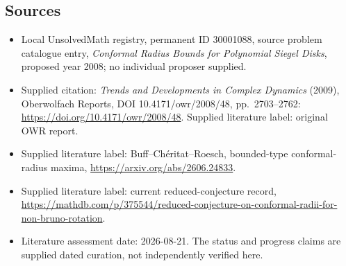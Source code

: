 \documentclass[11pt]{article}
\begin{document}
\subsection{Sources}
\begin{itemize}\item Local UnsolvedMath registry, permanent ID 30001088, source problem catalogue entry, \emph{Conformal Radius Bounds for Polynomial Siegel Disks}, proposed year 2008; no individual proposer supplied.\item Supplied citation: \emph{Trends and Developments in Complex Dynamics} (2009), Oberwolfach Reports, DOI 10.4171/owr/2008/48, pp.\ 2703--2762: \url{https://doi.org/10.4171/owr/2008/48}. Supplied literature label: original OWR report.\item Supplied literature label: Buff--Ch\'eritat--Roesch, bounded-type conformal-radius maxima, \url{https://arxiv.org/abs/2606.24833}.\item Supplied literature label: current reduced-conjecture record, \url{https://mathdb.com/p/375544/reduced-conjecture-on-conformal-radii-for-non-bruno-rotation}.\item Literature assessment date: 2026-08-21. The status and progress claims are supplied dated curation, not independently verified here.\end{itemize}
\end{document}

